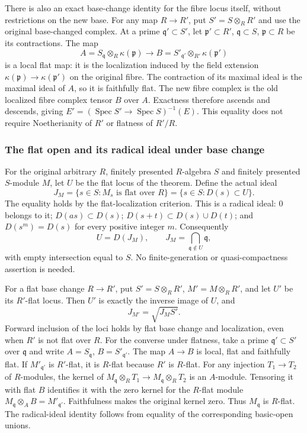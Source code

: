 There is also an exact base-change identity for the fibre locus itself, without restrictions on the new base. For any map \(R\to R'\), put \(S'=S\otimes_R R'\) and use the original base-changed complex. At a prime \(\mathfrak q'\subset S'\), let \(\mathfrak p'\subset R'\), \(\mathfrak q\subset S\), \(\mathfrak p\subset R\) be its contractions. The map \[
A=S_{\mathfrak q}\otimes_R\kappa(\mathfrak p)
\longrightarrow
B=S'_{\mathfrak q'}\otimes_{R'}\kappa(\mathfrak p')
\] is a local flat map: it is the localization induced by the field extension \(\kappa(\mathfrak p)\to\kappa(\mathfrak p')\) on the original fibre. The contraction of its maximal ideal is the maximal ideal of \(A\), so it is faithfully flat. The new fibre complex is the old localized fibre complex tensor \(B\) over \(A\). Exactness therefore ascends and descends, giving \(E'=(\operatorname{Spec}S'\to\operatorname{Spec}S)^{-1}(E)\). This equality does not require Noetherianity of \(R'\) or flatness of \(R'/R\).

\subsubsection{The flat open and its radical ideal under base change}\label{algebra-proof-039-the-flat-open-and-its-radical-ideal-under-base-change}

For the original arbitrary \(R\), finitely presented \(R\)-algebra \(S\) and finitely presented \(S\)-module \(M\), let \(U\) be the flat locus of the theorem. Define the actual ideal \[
J_M=\{s\in S:M_s\text{ is flat over }R\}
    =\{s\in S:D(s)\subset U\}.
\] The equality holds by the flat-localization criterion. This is a radical ideal: \(0\) belongs to it; \(D(as)\subset D(s)\); \(D(s+t)\subset D(s)\cup D(t)\); and \(D(s^m)=D(s)\) for every positive integer \(m\). Consequently \[
U=D(J_M),\qquad
J_M=\bigcap_{\mathfrak q\notin U}\mathfrak q,
\] with empty intersection equal to \(S\). No finite-generation or quasi-compactness assertion is needed.

For a flat base change \(R\to R'\), put \(S'=S\otimes_R R'\), \(M'=M\otimes_R R'\), and let \(U'\) be its \(R'\)-flat locus. Then \(U'\) is exactly the inverse image of \(U\), and \[
J_{M'}=\sqrt{J_M S'}.
\] Forward inclusion of the loci holds by flat base change and localization, even when \(R'\) is not flat over \(R\). For the converse under flatness, take a prime \(\mathfrak q'\subset S'\) over \(\mathfrak q\) and write \(A=S_{\mathfrak q}\), \(B=S'_{\mathfrak q'}\). The map \(A\to B\) is local, flat and faithfully flat. If \(M'_{\mathfrak q'}\) is \(R'\)-flat, it is \(R\)-flat because \(R'\) is \(R\)-flat. For any injection \(T_1\to T_2\) of \(R\)-modules, the kernel of \(M_{\mathfrak q}\otimes_R T_1\to M_{\mathfrak q}\otimes_R T_2\) is an \(A\)-module. Tensoring it with flat \(B\) identifies it with the zero kernel for the \(R\)-flat module \(M_{\mathfrak q}\otimes_A B=M'_{\mathfrak q'}\). Faithfulness makes the original kernel zero. Thus \(M_{\mathfrak q}\) is \(R\)-flat. The radical-ideal identity follows from equality of the corresponding basic-open unions.

